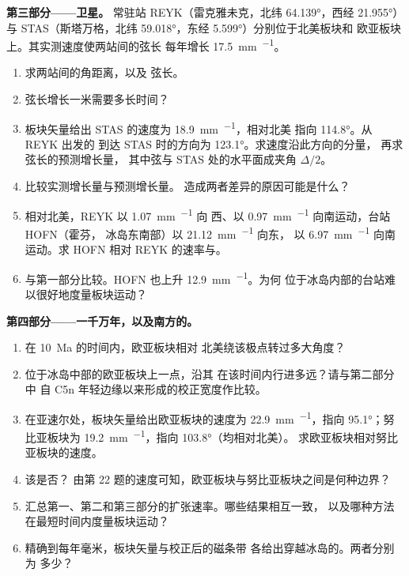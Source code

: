 \begin{problem}
\noindent\textbf{第三部分——卫星。}
常驻站 REYK（雷克雅未克，北纬 \ang{64.139}，西经 \ang{21.955}）与
STAS（斯塔万格，北纬 \ang{59.018}，东经 \ang{5.599}）分别位于北美板块和
欧亚板块上。其实测速度使两站间的弦长
每年增长 \qty{17.5}{mm.^{-1}}。
\begin{enumerate}[resume]
  \item 求两站间的角距离，以及
        弦长。
  \item 弦长增长一米需要多长时间？
  \item 板块矢量给出 STAS 的速度为 \qty{18.9}{mm.^{-1}}，相对北美
        指向 \ang{114.8}。从 REYK 出发的
        到达 STAS 时的方向为 \ang{123.1}。求速度沿此方向的分量，
        再求弦长的预测增长量，
        其中弦与 STAS 处的水平面成夹角 $\Delta/2$。
  \item 比较实测增长量与预测增长量。
        造成两者差异的原因可能是什么？
  \item 相对北美，REYK 以 \qty{1.07}{mm.^{-1}} 向
        西、以 \qty{0.97}{mm.^{-1}} 向南运动，台站 HOFN（霍芬，
        冰岛东南部）以 \qty{21.12}{mm.^{-1}} 向东，
        以 \qty{6.97}{mm.^{-1}} 向南运动。求 HOFN
        相对 REYK 的速率与。
  \item 与第一部分比较。HOFN 也上升 \qty{12.9}{mm.^{-1}}。为何
        位于冰岛内部的台站难以很好地度量板块运动？
\end{enumerate}

\noindent\textbf{第四部分——一千万年，以及南方的。}
\begin{enumerate}[resume]
  \item 在 \qty{10}{Ma} 的时间内，欧亚板块相对
        北美绕该极点转过多大角度？
  \item 位于冰岛中部的欧亚板块上一点，沿其
        在该时间内行进多远？请与第二部分中
        自 C5n 年轻边缘以来形成的校正宽度作比较。
  \item 在亚速尔处，板块矢量给出欧亚板块的速度为
        \qty{22.9}{mm.^{-1}}，指向 \ang{95.1}；努比亚板块为
        \qty{19.2}{mm.^{-1}}，指向 \ang{103.8}（均相对北美）。
        求欧亚板块相对努比亚板块的速度。
  \item 该是否？
        由第 22 题的速度可知，欧亚板块与努比亚板块之间是何种边界？
  \item 汇总第一、第二和第三部分的扩张速率。哪些结果相互一致，
        以及哪种方法在最短时间内度量板块运动？
  \item 精确到每年毫米，板块矢量与校正后的磁条带
        各给出穿越冰岛的。两者分别为
        多少？
\end{enumerate}
\end{problem}
